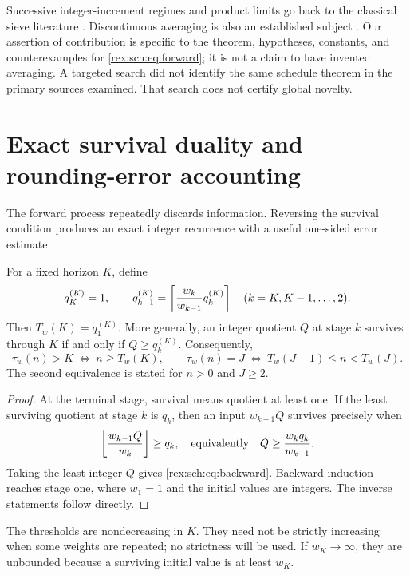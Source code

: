 Successive integer-increment regimes and product limits go back to the
classical sieve literature \cite{erdos-jabotinsky}. Discontinuous averaging is also
an established subject \cite{averaging}. Our assertion of contribution
is specific to the theorem, hypotheses, constants, and counterexamples
for \eqref{rex:sch:eq:forward}; it is not a claim to have invented averaging.
A targeted search did not identify the same schedule theorem in the
primary sources examined. That search does not certify global novelty.

\section{Exact survival duality and rounding-error accounting}
\label{rex:sch:sec:duality}

The forward process repeatedly discards information. Reversing the
survival condition produces an exact integer recurrence with a useful
one-sided error estimate.

\begin{lemma}\label{rex:sch:lem:duality}
For a fixed horizon $K$, define
\begin{equation}\label{rex:sch:eq:backward}
 q_K^{(K)}=1,\qquad
 q_{k-1}^{(K)}=\left\lceil \frac{w_k}{w_{k-1}}q_k^{(K)}\right\rceil
 \quad(k=K,K-1,\ldots,2).
\end{equation}
Then $T_w(K)=q_1^{(K)}$. More generally, an integer quotient $Q$ at stage
$k$ survives through $K$ if and only if $Q\geq q_k^{(K)}$.
Consequently,
\begin{equation}\label{rex:sch:eq:inverse}
 \tau_w(n)>K\ \Longleftrightarrow\ n\geq T_w(K),\qquad
\tau_w(n)=J\ \Longleftrightarrow\ T_w(J-1)\leq n<T_w(J).
\end{equation}
The second equivalence is stated for $n>0$ and $J\geq2$.
\end{lemma}

\begin{proof}
At the terminal stage, survival means quotient at least one. If the
least surviving quotient at stage $k$ is $q_k$, then an input
$w_{k-1}Q$ survives precisely when
\[
 \left\lfloor \frac{w_{k-1}Q}{w_k}\right\rfloor\geq q_k,
 \quad\text{equivalently}\quad
 Q\geq\frac{w_kq_k}{w_{k-1}}.
\]
Taking the least integer $Q$ gives \eqref{rex:sch:eq:backward}. Backward
induction reaches stage one, where $w_1=1$ and the initial values are
integers. The inverse statements follow directly.
\end{proof}

The thresholds are nondecreasing in $K$. They need not be strictly
increasing when some weights are repeated; no strictness will be used.
If $w_K\to\infty$, they are unbounded because a surviving initial value
is at least $w_K$.

